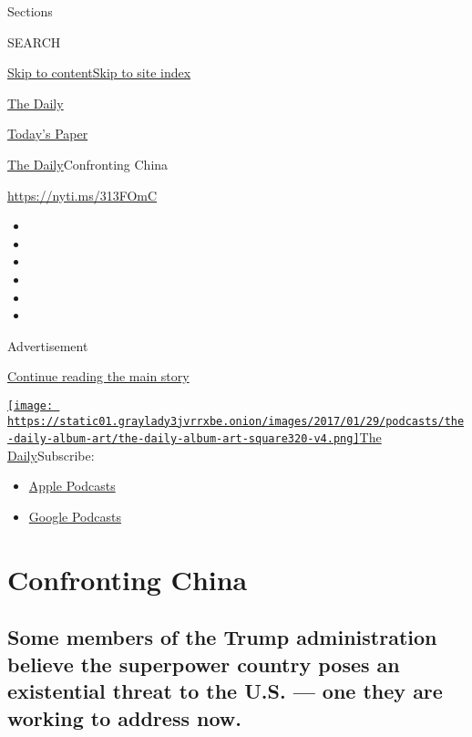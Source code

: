 Sections

SEARCH

\protect\hyperlink{site-content}{Skip to
content}\protect\hyperlink{site-index}{Skip to site index}

\href{https://www.nytimes3xbfgragh.onion/podcasts/the-daily}{The Daily}

\href{https://myaccount.nytimes3xbfgragh.onion/auth/login?response_type=cookie\&client_id=vi}{}

\href{https://www.nytimes3xbfgragh.onion/section/todayspaper}{Today's
Paper}

\href{/podcasts/the-daily}{The Daily}\textbar{}Confronting China

\url{https://nyti.ms/313FOmC}

\begin{itemize}
\item
\item
\item
\item
\item
\item
\end{itemize}

Advertisement

\protect\hyperlink{after-top}{Continue reading the main story}

\href{https://www.nytimes3xbfgragh.onion/column/the-daily}{\texttt{[image: https://static01.graylady3jvrrxbe.onion/images/2017/01/29/podcasts/the-daily-album-art/the-daily-album-art-square320-v4.png]}The
Daily}Subscribe:

\begin{itemize}
\tightlist
\item
  \href{https://itunes.apple.com/us/podcast/id1200361736}{Apple
  Podcasts}
\item
  \href{https://www.google.com/podcasts?feed=aHR0cHM6Ly9yc3MuYXJ0MTkuY29tL3RoZS1kYWlseQ\%3D\%3D}{Google
  Podcasts}
\end{itemize}

\hypertarget{confronting-china}{%
\section{Confronting China}\label{confronting-china}}

\hypertarget{some-members-of-the-trump-administration-believe-the-superpower-country-poses-an-existential-threat-to-the-us--one-they-are-working-to-address-now}{%
\subsection{Some members of the Trump administration believe the
superpower country poses an existential threat to the U.S. --- one they
are working to address
now.}\label{some-members-of-the-trump-administration-believe-the-superpower-country-poses-an-existential-threat-to-the-us--one-they-are-working-to-address-now}}

